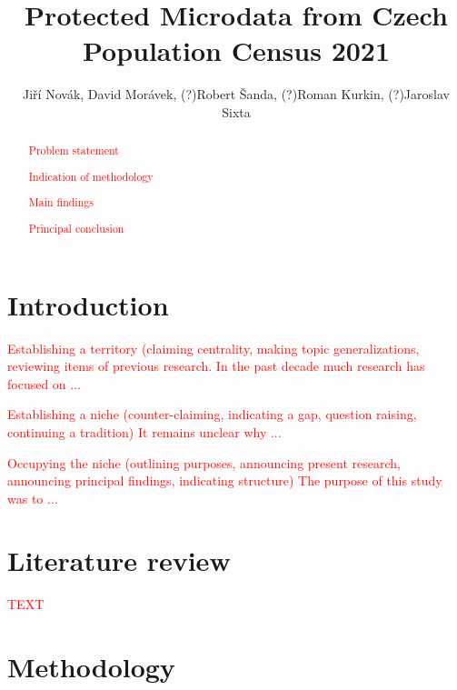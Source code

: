 \documentclass{article}
\title{Protected Microdata from Czech Population Census 2021
}
\author{Jiří Novák,
        David Morávek,
        (?)Robert Šanda,
        (?)Roman Kurkin,
        (?)Jaroslav Sixta
        }
\begin{document}
\maketitle

\begin{abstract}
\textcolor{red}{Problem statement} 

\textcolor{red}{Indication of methodology} 

\textcolor{red}{Main findings} 

\textcolor{red}{Principal conclusion} 
\end{abstract}

\section{Introduction}

\textcolor{red}{Establishing a territory (claiming centrality, making topic generalizations, reviewing items of previous research.} 
\textcolor{red}{In the past decade much research has focused on ...} 

\textcolor{red}{Establishing a niche (counter-claiming, indicating a gap, question raising, continuing a tradition)} 
\textcolor{red}{It remains unclear why ...} 

\textcolor{red}{Occupying the niche (outlining purposes, announcing present research, announcing principal findings, indicating structure)} 
\textcolor{red}{The purpose of this study was to ...} 

\section{Literature review}

\textcolor{red}{TEXT} 

\section{Methodology}
\end{document}
